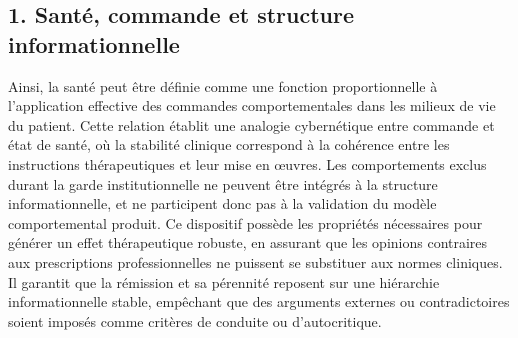 \documentclass[12pt,a4paper]{article}
\begin{document}
\subsection*{1. Santé, commande et structure informationnelle}
Ainsi, la santé peut être définie comme une fonction proportionnelle à l’application effective des commandes comportementales dans les milieux de vie du patient. Cette relation établit une analogie cybernétique entre commande et état de santé, où la stabilité clinique correspond à la cohérence entre les instructions thérapeutiques et leur mise en œuvres. Les comportements exclus durant la garde institutionnelle ne peuvent être intégrés à la structure informationnelle, et ne participent donc pas à la validation du modèle comportemental produit.
Ce dispositif possède les propriétés nécessaires pour générer un effet thérapeutique robuste, en assurant que les opinions contraires aux prescriptions professionnelles ne puissent se substituer aux normes cliniques. Il garantit que la rémission et sa pérennité reposent sur une hiérarchie informationnelle stable, empêchant que des arguments externes ou contradictoires soient imposés comme critères de conduite ou d’autocritique.
\end{document}
